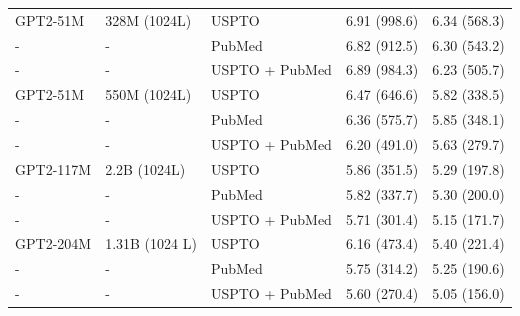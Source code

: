 \documentclass[10pt]{article} %
\begin{document}
\begin{table}[h]
\begin{tabularx}{1\textwidth}{lXXXX}
GPT2-51M & 328M (1024L) & USPTO  & 6.91 (998.6) & 6.34 (568.3) \\ 
- & - & PubMed & 6.82 (912.5) & 6.30 (543.2) \\ 
- & - & USPTO + PubMed & 6.89 (984.3) & 6.23 (505.7) \\
\hline
GPT2-51M & 550M (1024L) & USPTO  & 6.47 (646.6) & 5.82 (338.5) \\ 
- & - & PubMed & 6.36 (575.7) & 5.85 (348.1) \\ 
- & - & USPTO + PubMed & 6.20 (491.0) & 5.63 (279.7) \\
\hline
GPT2-117M & 2.2B (1024L) & USPTO  & 5.86 (351.5) & 5.29 (197.8) \\ 
- & - & PubMed & 5.82 (337.7) & 5.30 (200.0) \\ 
- & - & USPTO + PubMed & 5.71 (301.4) & 5.15 (171.7) \\ 
\hline
GPT2-204M & 1.31B (1024 L) & USPTO  & 6.16 (473.4) & 5.40 (221.4) \\ 
- & - & PubMed & 5.75 (314.2) & 5.25 (190.6) \\ 
- & - & USPTO + PubMed & 5.60 (270.4) & 5.05 (156.0) \\ 

\bottomrule
\end{tabularx}
\label{tab:div_vs_ce_val_cont}

\end{table}
\end{document}
